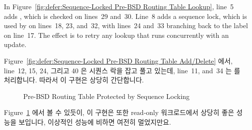 In
Figure~\ref{fig:defer:Sequence-Locked Pre-BSD Routing Table Lookup},
line~5 adds , which is checked on lines~29 and~30.
Line~8 adds a sequence lock, which is used by 
on lines~18, 23, and~32, with lines~24 and~33 branching back to
the  label on line~17.
The effect is to retry any lookup that runs concurrently with an update.
\fi

Figure~\ref{fig:defer:Sequence-Locked Pre-BSD Routing Table Add/Delete} 에서,
line~12, 15, 24, 그리고 40 은 시퀀스 락을 잡고 풀고 있는데, line~11, and~34 는
 를 처리합니다.
따라서 이 구현은 상당히 간단합니다.

\begin{figure}[tb]
\centering
{}
\caption{Pre-BSD Routing Table Protected by Sequence Locking}
\label{fig:defer:Pre-BSD Routing Table Protected by Sequence Locking}
\end{figure}

Figure~\ref{fig:defer:Pre-BSD Routing Table Protected by Sequence Locking} 에서 볼 수 있듯이,
이 구현은 또한 read-only 워크로드에서 상당히 좋은 성능을 보입니다, 이상적인 성능에 비하면 여전히 멀었지만요.

